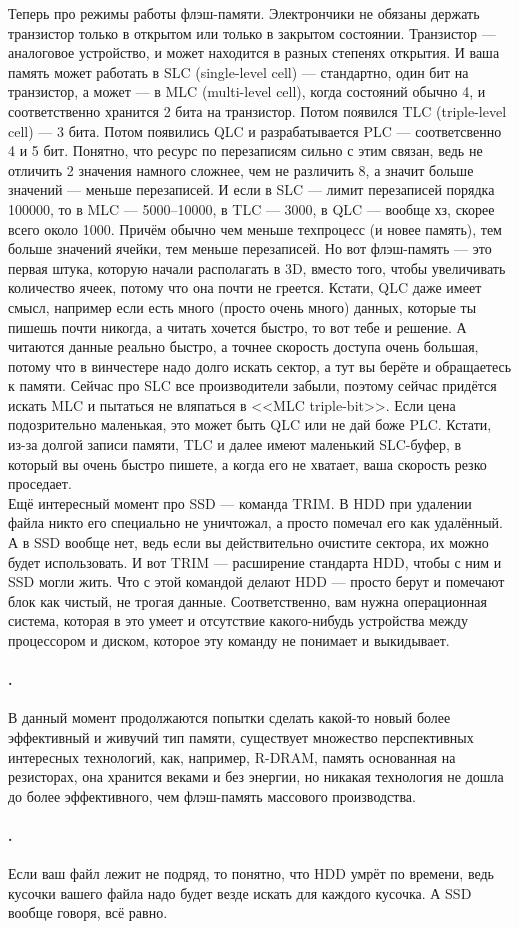 \documentclass{article}
\begin{document}
    Теперь про режимы работы флэш-памяти. Электрончики не обязаны держать транзистор только в открытом или только в закрытом состоянии. Транзистор --- аналоговое устройство, и может находится в разных степенях открытия. И ваша память может работать в SLC (single-level cell) --- стандартно, один бит на транзистор, а может --- в MLC (multi-level cell), когда состояний обычно 4, и соответственно хранится 2 бита на транзистор. Потом появился TLC (triple-level cell) --- 3 бита. Потом появились QLC и разрабатывается PLC --- соответсвенно 4 и 5 бит. Понятно, что ресурс по перезаписям сильно с этим связан, ведь не отличить 2 значения намного сложнее, чем не различить 8, а значит больше значений --- меньше перезаписей. И если в SLC --- лимит перезаписей порядка 100000, то в MLC --- 5000--10000, в TLC --- 3000, в QLC --- вообще хз, скорее всего около 1000. Причём обычно чем меньше техпроцесс (и новее память), тем больше значений ячейки, тем меньше перезаписей. Но вот флэш-память --- это первая штука, которую начали располагать в 3D, вместо того, чтобы увеличивать количество ячеек, потому что она почти не греется. Кстати, QLC даже имеет смысл, например если есть много (просто очень много) данных, которые ты пишешь почти никогда, а читать хочется быстро, то вот тебе и решение. А читаются данные реально быстро, а точнее скорость доступа очень большая, потому что в винчестере надо долго искать сектор, а тут вы берёте и обращаетесь к памяти. Сейчас про SLC все производители забыли, поэтому сейчас придётся искать MLC и пытаться не вляпаться в <<MLC triple-bit>>. Если цена подозрительно маленькая, это может быть QLC или не дай боже PLC. Кстати, из-за долгой записи памяти, TLC и далее имеют маленький SLC-буфер, в который вы очень быстро пишете, а когда его не хватает, ваша скорость резко проседает.\\
    Ещё интересный момент про SSD --- команда TRIM. В HDD при удалении файла никто его специально не уничтожал, а просто помечал его как удалённый. А в SSD вообще нет, ведь если вы действительно очистите сектора, их можно будет использовать. И вот TRIM --- расширение стандарта HDD, чтобы с ним и SSD могли жить. Что с этой командой делают HDD --- просто берут и помечают блок как чистый, не трогая данные. Соответственно, вам нужна операционная система, которая в это умеет и отсутствие какого-нибудь устройства между процессором и диском, которое эту команду не понимает и выкидывает.
    \paragraph{.}
    В данный момент продолжаются попытки сделать какой-то новый более эффективный и живучий тип памяти, существует множество перспективных интересных технологий, как, например, R-DRAM, память основанная на резисторах, она хранится веками и без энергии, но никакая технология не дошла до более эффективного, чем флэш-память массового производства.
    \paragraph{.}
    Если ваш файл лежит не подряд, то понятно, что HDD умрёт по времени, ведь кусочки вашего файла надо будет везде искать для каждого кусочка. А SSD вообще говоря, всё равно.
\end{document}
